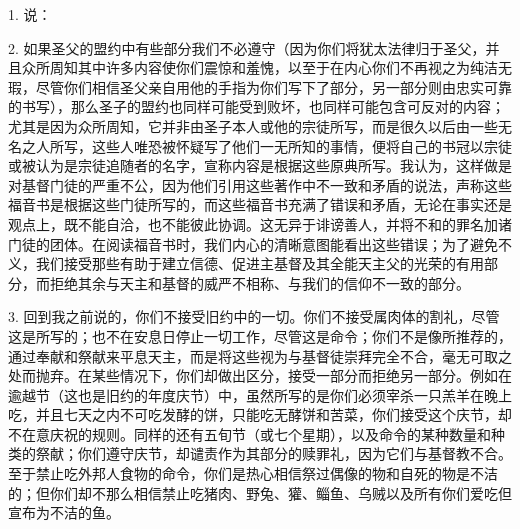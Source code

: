 1. 说：\par

2. 如果圣父的盟约中有些部分我们不必遵守（因为你们将犹太法律归于圣父，并且众所周知其中许多内容使你们震惊和羞愧，以至于在内心你们不再视之为纯洁无瑕，尽管你们相信圣父亲自用他的手指为你们写下了部分，另一部分则由忠实可靠的书写），那么圣子的盟约也同样可能受到败坏，也同样可能包含可反对的内容；尤其是因为众所周知，它并非由圣子本人或他的宗徒所写，而是很久以后由一些无名之人所写，这些人唯恐被怀疑写了他们一无所知的事情，便将自己的书冠以宗徒或被认为是宗徒追随者的名字，宣称内容是根据这些原典所写。我认为，这样做是对基督门徒的严重不公，因为他们引用这些著作中不一致和矛盾的说法，声称这些福音书是根据这些门徒所写的，而这些福音书充满了错误和矛盾，无论在事实还是观点上，既不能自洽，也不能彼此协调。这无异于诽谤善人，并将不和的罪名加诸门徒的团体。在阅读福音书时，我们内心的清晰意图能看出这些错误；为了避免不义，我们接受那些有助于建立信德、促进主基督及其全能天主父的光荣的有用部分，而拒绝其余与天主和基督的威严不相称、与我们的信仰不一致的部分。\par

3. 回到我之前说的，你们不接受旧约中的一切。你们不接受属肉体的割礼，尽管这是所写的；也不在安息日停止一切工作，尽管这是命令；你们不是像所推荐的，通过奉献和祭献来平息天主，而是将这些视为与基督徒崇拜完全不合，毫无可取之处而抛弃。在某些情况下，你们却做出区分，接受一部分而拒绝另一部分。例如在逾越节（这也是旧约的年度庆节）中，虽然所写的是你们必须宰杀一只羔羊在晚上吃，并且七天之内不可吃发酵的饼，只能吃无酵饼和苦菜，你们接受这个庆节，却不在意庆祝的规则。同样的还有五旬节（或七个星期），以及命令的某种数量和种类的祭献；你们遵守庆节，却谴责作为其部分的赎罪礼，因为它们与基督教不合。至于禁止吃外邦人食物的命令，你们是热心相信祭过偶像的物和自死的物是不洁的；但你们却不那么相信禁止吃猪肉、野兔、獾、鲻鱼、乌贼以及所有你们爱吃但宣布为不洁的鱼。\par

